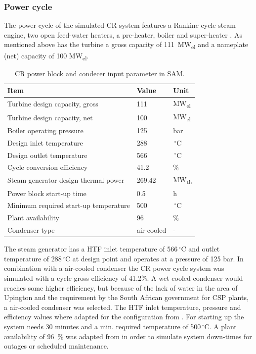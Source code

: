 \documentclass[Master,MEE,english]{twbook}%
\begin{document}
\subsubsection{Power cycle}
The power cycle of the simulated CR system features a Rankine-cycle steam engine, two open feed-water heaters, a pre-heater, boiler and super-heater \cite{NREL2015a}. As mentioned above has the turbine a gross capacity of 111~MW\textsubscript{el} and a nameplate (net) capacity of 100 MW\textsubscript{el}. 
\begin{table}[!h]  
  \centering
	\begin{tabular}{  p{7.0cm}  C{2.0cm}  C{2.0cm} } 
	\hline	
\textbf{Item} & \textbf{Value} & \textbf{Unit} \\ \hline \hline
Turbine design capacity, gross  & 111 & MW\textsubscript{el} \\ 
Turbine design capacity, net & 100 & MW\textsubscript{el} \\ 
Boiler operating pressure & 125 & bar \\ 
Design inlet temperature & 288 & $\,^{\circ}\mathrm{C}$ \\ 
Design outlet temperature & 566 & $\,^{\circ}\mathrm{C}$ \\ 
Cycle conversion efficiency & 41.2 & \% \\ 
Steam generator design thermal power & 269.42 & MW\textsubscript{th} \\
Power block start-up time & 0.5 & h \\ 
Minimum required start-up temperature & 500 & $\,^{\circ}\mathrm{C}$ \\
Plant availability  & 96 & \%\\
Condenser type & air-cooled & - \\ 
\hline
\end{tabular}
\caption[CR power block and condecer input parameter in SAM.]{CR power block and condecer input parameter in SAM.}\label{tbl: CRPowerplant}
\end{table}
The steam generator has a HTF inlet temperature of 566$\,^{\circ}\mathrm{C}$ and outlet temperature of 288$\,^{\circ}\mathrm{C}$ at design point and operates at a pressure of 125 bar. In combination with a air-cooled condenser the CR power cycle system was simulated with a cycle gross efficiency of 41.2\%. A wet-cooled condenser would reaches some higher efficiency, but because of the lack of water in the area of Upington and the requirement by the South African government for CSP plants, a air-cooled condenser was selected. The HTF inlet temperature, pressure and efficiency values where adapted for the configuration from \cite{Kolb2011a}. For starting up the system 
needs 30 minutes and a min. required temperature of 500$\,^{\circ}\mathrm{C}$. A plant availability of 96~\% was adapted from \cite{Morin2012} in order to simulate system down-times for outages or scheduled maintenance.
\end{document}
